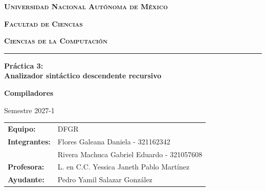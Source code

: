 \documentclass[12pt, letterpaper]{article}
\begin{document}
\begin{titlepage}
    \centering
    
    \begin{minipage}{0.45\textwidth}
        \raggedright
        
    \end{minipage}%
    \hfill
    \begin{minipage}{0.45\textwidth}
        \raggedleft
        
    \end{minipage}
    
    \vspace{0.8cm}
    
    {\scshape\Large\textbf{Universidad Nacional Autónoma de México}\par}
    \vspace{0.3cm}
    {\scshape\large\textbf{Facultad de Ciencias}\par}
    \vspace{0.3cm}
    {\scshape\large\textbf{Ciencias de la Computación}\par}
    
    \vspace{0.4cm}
    \rule{\linewidth}{1.5pt}
    \vspace{1.0cm}
    
    {\huge\bfseries Práctica 3: \\ Analizador sintáctico descendente recursivo\par}
    
    \vspace{1.2cm}
    
    {\Large \textbf{Compiladores} \par}
    \vspace{0.2cm}
    {\large Semestre 2027-1 \par}
    
    \vspace{1.5cm}
    
    \begin{center}
        \begin{tabular}{ll}
            \textbf{Equipo:} & DFGR \\[0.3cm]
            \textbf{Integrantes:} & Flores Galeana Daniela - 321162342 \\
                                & Rivera Machuca Gabriel Eduardo - 321057608 \\[0.5cm]
            \textbf{Profesora:} & L. en C.C. Yessica Janeth Pablo Martínez \\
            \textbf{Ayudante:} & Pedro Yamil Salazar González \\
        \end{tabular}
    \end{center}
    

\end{titlepage}
\end{document}
